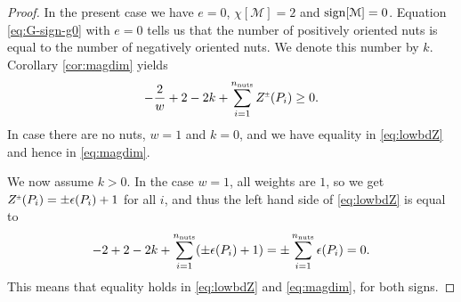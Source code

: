 \documentclass[a4paper,10pt,reqno]{amsart}
\newcommand{\nut}{P}
\newcommand{\sign}{\mathop{\rm sign}}
\newcommand{\cM}{\mathcal{M}}
\theoremstyle{plain}
\newcommand{\nnuts}{n_{\text{\rm nuts}}}
\newcommand{\PM}[1]{{{#1}^{\hspace{-.5pt}\scaleto{\pm}{3.5pt}}}}
\numberwithin{equation}{section}
\begin{document}
\begin{proof}
In the present case we have $e=0$, $\chi[\cM]=2$ and $\sign[\cM]=0$. Equation \eqref{eq:G-sign-g0} with $e=0$ tells us that the number of positively oriented nuts is equal to the number of negatively oriented nuts. We denote this number by $k$. Corollary \ref{cor:magdim} yields 
\begin{align} \label{eq:lowbdZ}
-\frac{2}{w} + 2 - 2k + \sum_{i=1}^{\nnuts}\PM{Z}(\nut_i) \geq 0.
\end{align} 
In case there are no nuts, $w=1$ and $k=0$, and we have equality in \eqref{eq:lowbdZ} and hence in 
\eqref{eq:magdim}. 

We now assume $k > 0$. 
In the case $w=1$, all weights are $1$, so we get $\PM{Z}(\nut_i)=\pm\epsilon(\nut_i)+1$ for all $i$, and thus the left hand side of \eqref{eq:lowbdZ} is equal to 
\begin{align} 
-2 +2-2k + \sum_{i=1}^{\nnuts}(\pm\epsilon(\nut_i)+1)
=
\pm\sum_{i=1}^{\nnuts}\epsilon(\nut_i) 
= 0 .
\end{align} 
This means that equality holds in \eqref{eq:lowbdZ} and \eqref{eq:magdim},  for both signs. 


\end{proof}
\end{document}
